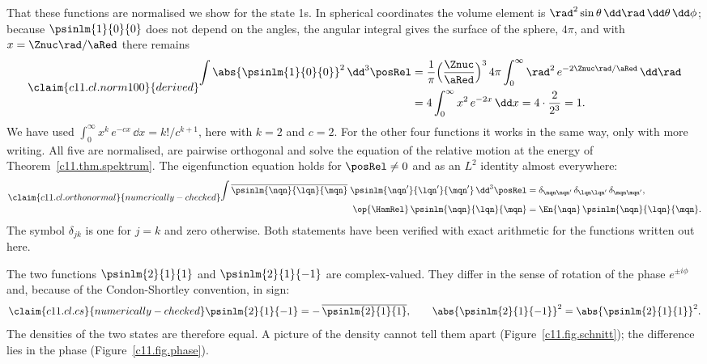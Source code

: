That these functions are normalised we show for the state 1s. In spherical
coordinates the volume element is $\rad^2\sin\theta\,\dd\rad\,\dd\theta\,\dd\phi$;
because $\psinlm{1}{0}{0}$ does not depend on the angles, the angular integral gives the
surface of the sphere, $4\pi$, and with $x = \Znuc\rad/\aRed$ there remains
\begin{equation}\label{c11.eq.norm100}\claim{c11.cl.norm100}{derived}
  \begin{aligned}
    \int \abs{\psinlm{1}{0}{0}}^2\,\dd^3\posRel
    &= \frac{1}{\pi}\Bigl(\frac{\Znuc}{\aRed}\Bigr)^{3}\,4\pi
      \int_0^\infty \rad^2\,e^{-2\Znuc\rad/\aRed}\,\dd\rad \\
    &= 4\int_0^\infty x^2\,e^{-2x}\,\dd x
     = 4 \cdot \frac{2}{2^3} = 1 .
  \end{aligned}
\end{equation}
We have used $\int_0^\infty x^k\,e^{-cx}\,\dd x = k!/c^{k + 1}$, here with $k = 2$ and
$c = 2$. For the other four functions it works in the same way, only with more writing.
All five are normalised, are pairwise orthogonal and solve the equation of the relative
motion at the energy of Theorem~\ref{c11.thm.spektrum}. The eigenfunction equation holds
for $\posRel \neq 0$ and as an $L^2$ identity almost everywhere:
\begin{equation}\label{c11.eq.orthonormal}\claim{c11.cl.orthonormal}{numerically-checked}
  \begin{aligned}
    \int \overline{\psinlm{\nqn}{\lqn}{\mqn}}\;\psinlm{\nqn'}{\lqn'}{\mqn'}\,\dd^3\posRel
    &= \delta_{\nqn\nqn'}\,\delta_{\lqn\lqn'}\,\delta_{\mqn\mqn'}, \\
    \op{\HamRel}\,\psinlm{\nqn}{\lqn}{\mqn} &= \En{\nqn}\,\psinlm{\nqn}{\lqn}{\mqn}.
  \end{aligned}
\end{equation}
The symbol $\delta_{jk}$ is one for $j = k$ and zero otherwise. Both statements have been
verified with exact arithmetic for the functions written out here.

The two functions $\psinlm{2}{1}{1}$ and $\psinlm{2}{1}{-1}$ are complex-valued. They
differ in the sense of rotation of the phase $e^{\pm i\phi}$ and, because of the
Condon-Shortley convention, in sign:
\begin{equation}\label{c11.eq.cs}\claim{c11.cl.cs}{numerically-checked}
  \psinlm{2}{1}{-1} = -\,\overline{\psinlm{2}{1}{1}},
  \qquad
  \abs{\psinlm{2}{1}{-1}}^2 = \abs{\psinlm{2}{1}{1}}^2 .
\end{equation}
The densities of the two states are therefore equal. A picture of the density cannot
tell them apart (Figure~\ref{c11.fig.schnitt}); the difference lies in the phase
(Figure~\ref{c11.fig.phase}).

